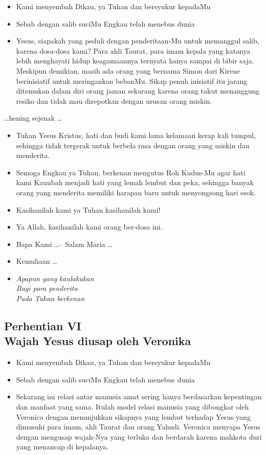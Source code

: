 \documentclass[a5paper,headsepline,titlepage,10pt,nnormalheadings,DIVcalc]{scrbook}
\newcommand{\BU}[1]{\begin{itemize} \item[U:] #1 \end{itemize}}
\newcommand{\BP}[1]{\begin{itemize} \item[P:] #1 \end{itemize}}
\newcommand{\BL}[1]{\begin{itemize} \item[L:] #1 \end{itemize}}
\begin{document}
\BP{Kami menyembah Dikau, ya Tuhan dan bersyukur kepadaMu}
\BU{Sebab dengan salib suciMu Engkau telah menebus dunia}
\BL{Yesus, siapakah yang peduli dengan penderitaan-Mu untuk memanggul salib, karena dosa-dosa kami? Para ahli Taurat, para imam kepala yang katanya lebih menghayati hidup keagamaannya ternyata hanya sampai di bibir saja. Meskipun demikian, masih ada orang yang bernama Simon dari Kirene berinisiatif untuk meringankan bebanMu. Sikap penuh inisiatif itu jarang ditemukan dalam diri orang jaman sekarang karena orang takut menanggung resiko dan tidak mau direpotkan dengan urusan orang miskin.}

\begin{center}\dots hening sejenak \dots\end{center}

\BP{Tuhan Yesus Kristus, hati dan budi kami lama kelamaan kerap kali tumpul, sehingga tidak tergerak untuk berbela rasa dengan orang yang miskin dan menderita.}
\BU{Semoga Engkau ya Tuhan, berkenan mengutus Roh Kudus-Mu agar hati kami Kauubah menjadi hati yang lemah lembut dan peka, sehingga banyak orang yang menderita memiliki harapan baru untuk menyongsong hari esok.}
\BP{Kasihanilah kami ya Tuhan kasihanilah kami!}
\BU{Ya Allah, kasihanilah kami orang ber-dosa ini.}
\BP{Bapa Kami \dots -- Salam Maria \dots}
\BP{Kemuliaan \dots}

\begin{itemize}
\item[6.] \it{Apapun yang kaulakukan
\\Bagi para penderita\\
Pada Tuhan berkenan}
\end{itemize}

\subsection*{Perhentian VI
\\Wajah Yesus diusap oleh Veronika}

\BP{Kami menyembah Dikau, ya Tuhan dan bersyukur kepadaMu}
\BU{Sebab dengan salib suciMu Engkau telah menebus dunia}
\BL{Sekarang ini relasi antar manusia amat sering hanya berdasarkan kepentingan dan manfaat yang sama. Itulah model relasi manusia yang dibongkar oleh Veronica dengan menunjukkan sikapnya yang lembut terhadap Yesus yang dimusuhi para imam, ahli Taurat dan orang Yahudi. Veronica menyapa Yesus dengan mengusap wajah-Nya yang terluka dan berdarah karena mahkota duri yang menancap di kepalanya.}
\end{document}
